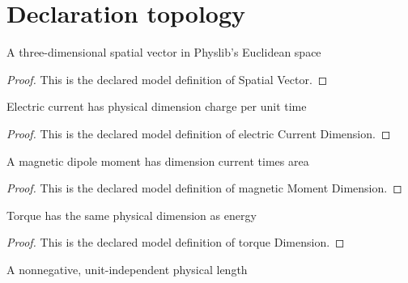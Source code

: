 \section{Declaration topology}
\begin{definition}
  \label{def:physics:phyx-mini-0609:phyxminiproblems-problemphyxmini0609-spatialvector}
  A three-dimensional spatial vector in Physlib's Euclidean space
\end{definition}
\begin{proof}
  This is the declared model definition of Spatial Vector.
\end{proof}
\begin{definition}
  \label{def:physics:phyx-mini-0609:phyxminiproblems-problemphyxmini0609-electriccurrentdimension}
  Electric current has physical dimension charge per unit time
\end{definition}
\begin{proof}
  This is the declared model definition of electric Current Dimension.
\end{proof}
\begin{definition}
  \label{def:physics:phyx-mini-0609:phyxminiproblems-problemphyxmini0609-magneticmomentdimension}
  A magnetic dipole moment has dimension current times area
\end{definition}
\begin{proof}
  This is the declared model definition of magnetic Moment Dimension.
\end{proof}
\begin{definition}
  \label{def:physics:phyx-mini-0609:phyxminiproblems-problemphyxmini0609-torquedimension}
  Torque has the same physical dimension as energy
\end{definition}
\begin{proof}
  This is the declared model definition of torque Dimension.
\end{proof}
\begin{definition}
  \label{def:physics:phyx-mini-0609:phyxminiproblems-problemphyxmini0609-lengthquantity}
  A nonnegative, unit-independent physical length
\end{definition}
